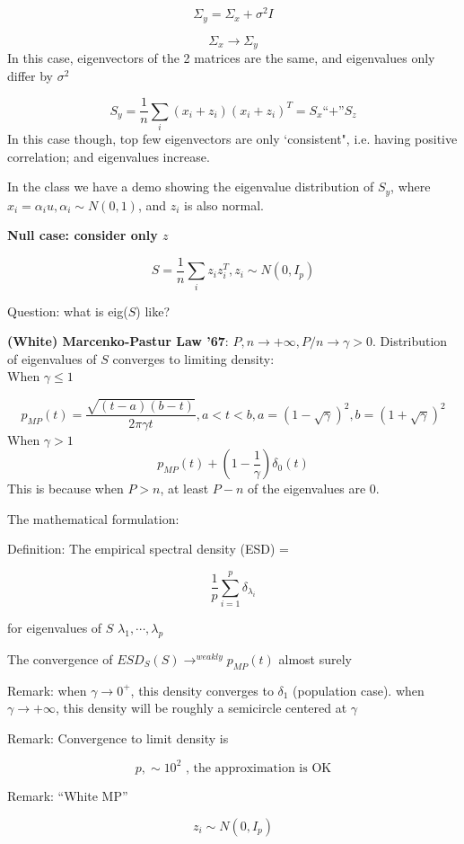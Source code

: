 \documentclass[12pt]{article}
\theoremstyle{plain}
\begin{document}
$$ \Sigma_y = \Sigma_x + \sigma^2 I $$

$$ \Sigma_x \rightarrow \Sigma_y $$
In this case, eigenvectors of the 2 matrices are the same, and eigenvalues only differ by $\sigma^2$

$$ S_y = \frac{1}{n} \sum_i (x_i + z_i ) (x_i + z_i)^T = S_x \text{``+''} S_z $$
In this case though, top few eigenvectors are only `consistent", i.e. having positive correlation; and eigenvalues increase.

In the class we have a demo showing the eigenvalue distribution of $S_y$, where $x_i = \alpha_i u, \alpha_i \sim N(0,1)$, and $z_i$ is also normal.

\textbf{Null case: consider only $z$}

$$ S = \frac{1}{n} \sum_i z_i z_i^T , z_i \sim N(0, I_p) $$

Question: what is eig($S$) like?

\textbf{(White) Marcenko-Pastur Law '67}: $ P, n \rightarrow + \infty, P/n \rightarrow \gamma > 0 $. Distribution of eigenvalues of $S$ converges to limiting density:\\
When $\gamma \leq 1$

$$p_{MP} (t) = \frac{\sqrt{(t-a)(b-t)}}{2\pi \gamma t}, a < t < b, a = (1-\sqrt{\gamma})^2 , b = (1+\sqrt{\gamma})^2$$
When  $\gamma > 1$
$$p_{MP} (t) + (1-\frac{1}{\gamma})\delta_0(t)$$
This is because when $P > n$, at least $P-n$ of the eigenvalues are 0.

The mathematical formulation:

Definition: The empirical spectral density (ESD) =

$$ \frac{1}{p} \sum_{i=1}^p \delta_{\lambda_i} $$

for eigenvalues of $S$ $\lambda_1 , \cdots, \lambda_p$

The convergence of $ESD_S(S) \rightarrow^{weakly} p_{MP} (t)$ almost surely

Remark: when $\gamma \rightarrow 0^+$, this density converges to $\delta_1$ (population case). when $\gamma \rightarrow +\infty$, this density will be roughly a semicircle centered at $\gamma$


Remark: Convergence to limit density is 

$$ p , \sim 10^2 \text{ , the approximation is OK} $$

Remark: ``White MP''

$$ z_i \sim N(0, I_p) $$
\end{document}
